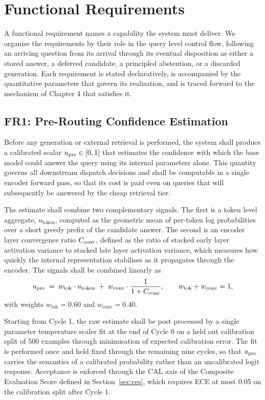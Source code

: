 \section{Functional Requirements}
\label{sec:functional-requirements}

A functional requirement names a capability the system must deliver. We organise the requirements by their role in the query level control flow, following an arriving question from its arrival through its eventual disposition as either a stored answer, a deferred candidate, a principled abstention, or a discarded generation. Each requirement is stated declaratively, is accompanied by the quantitative parameters that govern its realisation, and is traced forward to the mechanism of Chapter 4 that satisfies it.

\subsection{FR1: Pre-Routing Confidence Estimation}
\label{sec:fr1}

Before any generation or external retrieval is performed, the system shall produce a calibrated scalar $u_{\text{pre}} \in [0,1]$ that estimates the confidence with which the base model could answer the query using its internal parameters alone. This quantity governs all downstream dispatch decisions and shall be computable in a single encoder forward pass, so that its cost is paid even on queries that will subsequently be answered by the cheap retrieval tier.

The estimate shall combine two complementary signals. The first is a token level aggregate, $u_{\text{token}}$, computed as the geometric mean of per-token log probabilities over a short greedy prefix of the candidate answer. The second is an encoder layer convergence ratio $C_{\text{conv}}$, defined as the ratio of stacked early layer activation variance to stacked late layer activation variance, which measures how quickly the internal representation stabilises as it propagates through the encoder. The signals shall be combined linearly as
\begin{equation}
u_{\text{pre}} \;=\; w_{\text{tok}} \cdot u_{\text{token}} \;+\; w_{\text{conv}} \cdot \frac{1}{1 + C_{\text{conv}}},
\qquad w_{\text{tok}} + w_{\text{conv}} = 1,
\label{eq:upre}
\end{equation}
with weights $w_{\text{tok}} = 0.60$ and $w_{\text{conv}} = 0.40$.

Starting from Cycle 1, the raw estimate shall be post processed by a single parameter temperature scaler fit at the end of Cycle 0 on a held out calibration split of 500 examples through minimisation of expected calibration error. The fit is performed once and held fixed through the remaining nine cycles, so that $u_{\text{pre}}$ carries the semantics of a calibrated probability rather than an uncalibrated logit response. Acceptance is enforced through the CAL axis of the Composite Evaluation Score defined in Section~\ref{sec:ces}, which requires ECE at most 0.05 on the calibration split after Cycle 1.

